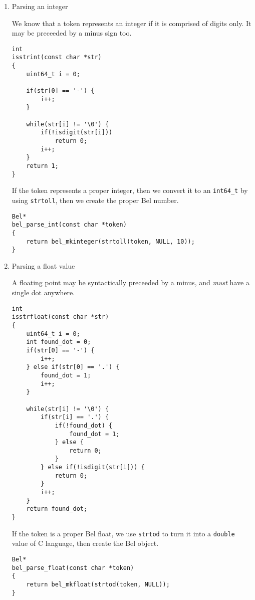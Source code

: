 \documentclass[openright,a4paper,twoside,12pt]{memoir}
\begin{document}
\begin{enumerate}
\item Parsing an integer
\label{sec:orgf57bcf6}

We  know that  a token  represents an  integer if  it is  comprised of
digits only. It may be preceeded by a minus sign too.

\begin{verbatim}
int
isstrint(const char *str)
{
    uint64_t i = 0;

    if(str[0] == '-') {
        i++;
    }

    while(str[i] != '\0') {
        if(!isdigit(str[i]))
            return 0;
        i++;
    }
    return 1;
}
\end{verbatim}

If the  token represents a  proper integer, then  we convert it  to an
\texttt{int64\_t} by using \texttt{strtoll}, then we create the proper Bel number.

\begin{verbatim}
Bel*
bel_parse_int(const char *token)
{
    return bel_mkinteger(strtoll(token, NULL, 10));
}
\end{verbatim}

\item Parsing a float value
\label{sec:org3f2cae3}

A floating point  may be syntactically preceeded by a  minus, and \emph{must}
have a single dot anywhere.

\begin{verbatim}
int
isstrfloat(const char *str)
{
    uint64_t i = 0;
    int found_dot = 0;
    if(str[0] == '-') {
        i++;
    } else if(str[0] == '.') {
        found_dot = 1;
        i++;
    }

    while(str[i] != '\0') {
        if(str[i] == '.') {
            if(!found_dot) {
                found_dot = 1;
            } else {
                return 0;
            }
        } else if(!isdigit(str[i])) {
            return 0;
        }
        i++;
    }
    return found_dot;
}
\end{verbatim}

If the token  is a proper Bel float,  we use \texttt{strtod} to turn  it into a
\texttt{double} value of C language, then create the Bel object.

\begin{verbatim}
Bel*
bel_parse_float(const char *token)
{
    return bel_mkfloat(strtod(token, NULL));
}
\end{verbatim}


\end{enumerate}
\end{document}
